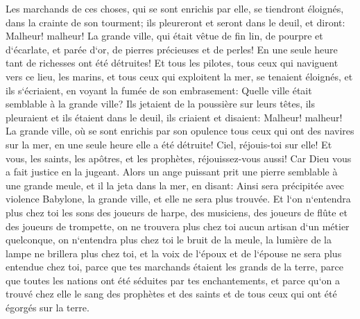 \verse Les marchands de ces choses, qui se sont enrichis par elle, se tiendront éloignés, dans la crainte de son tourment; ils pleureront et seront dans le deuil, 
\verse et diront: Malheur! malheur! La grande ville, qui était vêtue de fin lin, de pourpre et d`écarlate, et parée d`or, de pierres précieuses et de perles! En une seule heure tant de richesses ont été détruites! 
\verse Et tous les pilotes, tous ceux qui naviguent vers ce lieu, les marins, et tous ceux qui exploitent la mer, se tenaient éloignés, 
\verse et ils s`écriaient, en voyant la fumée de son embrasement: Quelle ville était semblable à la grande ville? 
\verse Ils jetaient de la poussière sur leurs têtes, ils pleuraient et ils étaient dans le deuil, ils criaient et disaient: Malheur! malheur! La grande ville, où se sont enrichis par son opulence tous ceux qui ont des navires sur la mer, en une seule heure elle a été détruite! 
\verse Ciel, réjouis-toi sur elle! Et vous, les saints, les apôtres, et les prophètes, réjouissez-vous aussi! Car Dieu vous a fait justice en la jugeant. 
\verse Alors un ange puissant prit une pierre semblable à une grande meule, et il la jeta dans la mer, en disant: Ainsi sera précipitée avec violence Babylone, la grande ville, et elle ne sera plus trouvée. 
\verse Et l`on n`entendra plus chez toi les sons des joueurs de harpe, des musiciens, des joueurs de flûte et des joueurs de trompette, on ne trouvera plus chez toi aucun artisan d`un métier quelconque, on n`entendra plus chez toi le bruit de la meule, 
\verse la lumière de la lampe ne brillera plus chez toi, et la voix de l`époux et de l`épouse ne sera plus entendue chez toi, parce que tes marchands étaient les grands de la terre, parce que toutes les nations ont été séduites par tes enchantements, 
\verse et parce qu`on a trouvé chez elle le sang des prophètes et des saints et de tous ceux qui ont été égorgés sur la terre. 

